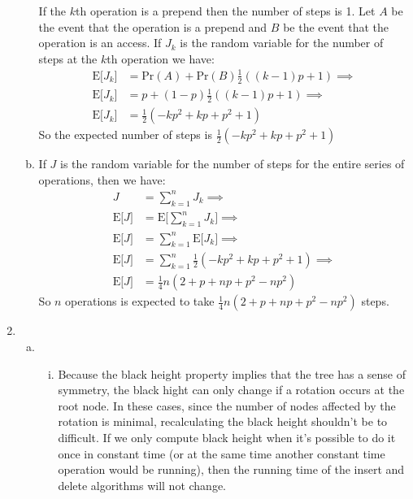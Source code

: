 \documentclass[letterpaper,10pt]{article}
\begin{document}
\begin{enumerate}
\begin{enumerate}[a)]
		If the $k$th operation is a prepend then the number of steps is 1. Let $A$ be the event that the operation is a prepend and $B$ be the event that the operation is an access. If $J_k$ is the random variable for the number of steps at the $k$th operation we have: 
		\begin{align*}
			\text{E}\big[J_k\big] & = \text{Pr}(A) + \text{Pr}(B)\frac{1}{2} ((k-1)p + 1)  \implies \\
			\text{E}\big[J_k\big] & = p + (1-p)\frac{1}{2} ((k-1)p + 1)  \implies \\
			\text{E}\big[J_k\big] & = \frac{1}{2} (-k p^2+k p+p^2+1) 
		\end{align*}
		So the expected number of steps is $\frac{1}{2} (-k p^2+k p+p^2+1) $
		\item If $J$ is the random variable for the number of steps for the entire series of operations, then we have:
		\begin{align*}
			J & = \sum^{n}_{k=1} J_k \implies \\
			\text{E}\big[J\big] & = \text{E}\Bigg[ \sum^{n}_{k=1} J_k \Bigg] \implies \\
			\text{E}\big[J\big] & = \sum^{n}_{k=1} \text{E}\big[ J_k \big] \implies \\
			\text{E}\big[J\big] & = \sum^{n}_{k=1} \frac{1}{2} (-k p^2+k p+p^2+1)  \implies \\
			\text{E}\big[J\big] & = \frac{1}{4} n (2+p+n p+p^2-n p^2)
		\end{align*}
		So $n$ operations is expected to take $\frac{1}{4} n (2+p+n p+p^2-n p^2)$ steps.
	\end{enumerate}
	\clearpage

	\item

	\begin{enumerate}[a)]
		\item 
		\begin{enumerate}[i.]
			\item Because the black height property implies that the tree has a sense of symmetry, the black hight can only change if a rotation occurs at the root node. In these cases, since the number of nodes affected by the rotation is minimal, recalculating the black height shouldn't be to difficult. If we only compute black height when it's possible to do it once in constant time (or at the same time another constant time operation would be running), then the running time of the insert and delete algorithms will not change.


\end{enumerate}
\end{enumerate}
\end{enumerate}
\end{document}
